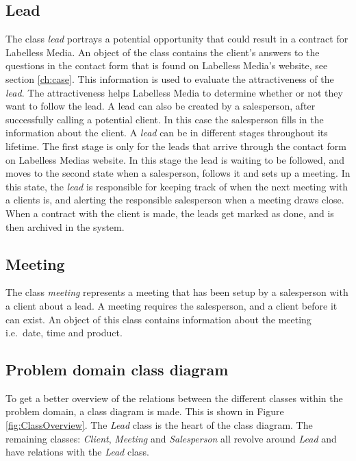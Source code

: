 \subsection{Lead}
The class \textit{lead} portrays a potential opportunity that could result in a contract for Labelless Media. An object of the class contains the client's answers to the questions in the contact form that is found on Labelless Media's website, see section \ref{ch:case}. This information is used to evaluate the attractiveness of the \textit{lead}. The attractiveness helps Labelless Media to determine whether or not they want to follow the lead. A lead can also be created by a salesperson, after successfully calling a potential client. In this case the salesperson fills in the information about the client. A \textit{lead} can be in different stages throughout its lifetime. The first stage is only for the leads that arrive through the contact form on Labelless Medias website. In this stage the lead is waiting to be followed, and moves to the second state when a salesperson, follows it and sets up a meeting. In this state, the \textit{lead} is responsible for keeping track of when the next meeting with a clients is, and alerting the responsible salesperson when a meeting draws close. When a contract with the client is made, the leads get marked as done, and is then archived in the system.

\subsection{Meeting}
The class \textit{meeting} represents a meeting that has been setup by a salesperson with a client about a lead. A meeting requires the salesperson, and a client before it can exist. An object of this class contains information about the meeting i.e.\ date, time and product.


\subsection{Problem domain class diagram}
\noindent
To get a better overview of the relations between the different classes within the problem domain, a class diagram is made. This is shown in Figure \ref{fig:ClassOverview}. 
The \textit{Lead} class is the heart of the class diagram. The remaining classes: \textit{Client}, \textit{Meeting} and \textit{Salesperson} all revolve around \textit{Lead} and have relations with the \textit{Lead} class. 

